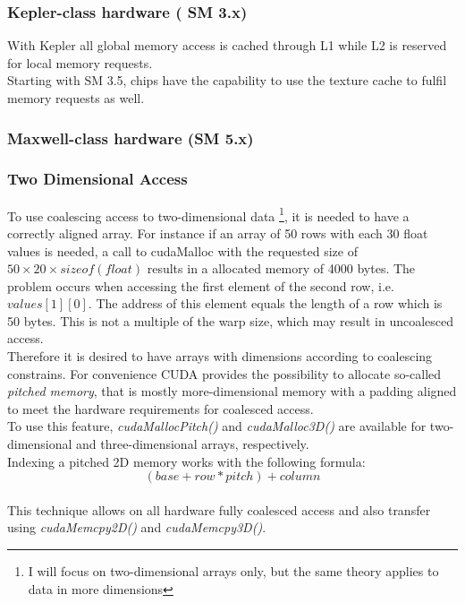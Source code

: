 

\subsubsection{Kepler-class hardware ( SM 3.x)}

With Kepler all global memory access is cached through L1 while L2 is reserved for local memory requests.\\
Starting with SM 3.5, chips have the capability to use the texture cache to fulfil memory requests as well.\\
\subsubsection{Maxwell-class hardware (SM 5.x)}

\subsubsection{Two Dimensional Access}
\label{2d_access}
To use coalescing access to two-dimensional data
\footnote{I will focus on two-dimensional arrays only, but the same theory applies to data in more dimensions},
it is needed to have a correctly aligned array.
For instance if an array of 50 rows with each 30 float values is needed,
a call to cudaMalloc with the requested size of $ 50 \times 20 \times sizeof(float) $ results in a allocated memory of 4000 bytes.
The problem occurs when accessing the first element of the second row, i.e. $ values[1][0] $.
The address of this element equals the length of a row which is 50 bytes. This is not a multiple of the warp size, which may result in uncoalesced access.\\
Therefore it is desired to have arrays with dimensions according to coalescing constrains.
For convenience CUDA provides the possibility to allocate so-called \emph{pitched memory},
that is mostly more-dimensional memory with a padding aligned to meet the hardware requirements for coalesced access.\\
To use this feature, \emph{cudaMallocPitch()} and \emph{cudaMalloc3D()} are available for two-dimensional and three-dimensional arrays, respectively.\\
Indexing a pitched 2D memory works with the following formula:\\
$$ (base + row * pitch) + column$$\\
This technique allows on all hardware fully coalesced access and also transfer using \emph{cudaMemcpy2D()} and \emph{cudaMemcpy3D()}.\\
